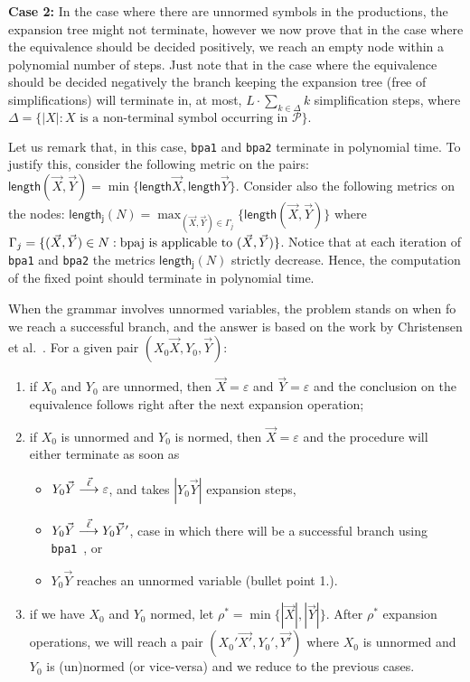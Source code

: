 \noindent\textbf{Case 2:} In the case where there are unnormed symbols
in the productions, the expansion tree might not terminate, however
we now prove that in the case where the equivalence should be decided
positively, we reach an empty node within a polynomial number of steps.
Just note that in the case where the equivalence should be decided negatively
the branch keeping the expansion tree (free of simplifications) will terminate 
in, at most, $L\cdot \sum_{k\in\Delta} k$ simplification steps, where 
$\Delta = \{|X| : X \text{ is a non-terminal symbol occurring in }\mathcal{P}\}.$

Let us remark that, in this case, \lstinline{bpa1} and \lstinline{bpa2}
terminate in polynomial time. To justify this, consider the following
metric on the pairs: $\mathsf{length}(\vec X, \vec Y) = 
\min \{\mathsf{length} \vec X, \mathsf{length} \vec Y\}.$ 
Consider also the following metrics on the nodes:
$\mathsf{length_j}(N) = \max_{(\vec X, \vec Y)\in \Gamma_j} 
\{\mathsf{length}(\vec X, \vec Y)\}$
where $\Gamma_j=\{(\vec X,\vec Y)\in N : \text{\lstinline{bpaj} is
applicable to }(\vec X,\vec Y) \}$. Notice that at each iteration
of \lstinline{bpa1} and \lstinline{bpa2} the metrics
$\mathsf{length_j}(N)$ strictly decrease. Hence, the computation
of the fixed point should terminate in polynomial time. %
 
When the grammar involves unnormed variables, the problem
stands on when fo we reach a successful branch, and the
answer is based on the work by Christensen et 
al.~\cite{DBLP:journals/iandc/ChristensenHS95}.
For a given pair $(X_0\vec X, Y_0,\vec Y)$:
\begin{enumerate}
	\item if $X_0$ and $Y_0$ are unnormed, then $\vec X = \varepsilon$
		  and $\vec Y = \varepsilon$ and the conclusion on the equivalence
		  follows right after the next expansion operation;
	\item if $X_0$ is unnormed and $Y_0$ is normed, then $\vec X = \varepsilon$
		  and the procedure will either terminate as soon as
		  \begin{itemize}
		  	\item $Y_0\vec Y\LTSderives[\vec\ell] \varepsilon$, and takes 
		  		  $|Y_0\vec Y|$ expansion steps,
		  	\item $Y_0\vec Y\LTSderives[\vec\ell] Y_0\vec Y'$, case in which
		  		  there will be a successful branch using 
		  		  \lstinline{bpa1}~\cite{DBLP:journals/iandc/ChristensenHS95}, or
		  	\item $Y_0\vec Y$ reaches an unnormed variable (bullet point 1.).
		  \end{itemize}
	\item if we have $X_0$ and $Y_0$ normed, let 
		  $\rho^* = \min \{|\vec X|, |\vec Y|\}$. After $\rho^*$ expansion
		  operations, we will reach a pair $(X_0'\vec{X'}, Y_0',\vec{Y'})$
		  where $X_0$ is unnormed and $Y_0$ is (un)normed (or vice-versa)
		  and we reduce to the previous cases.
\end{enumerate}

